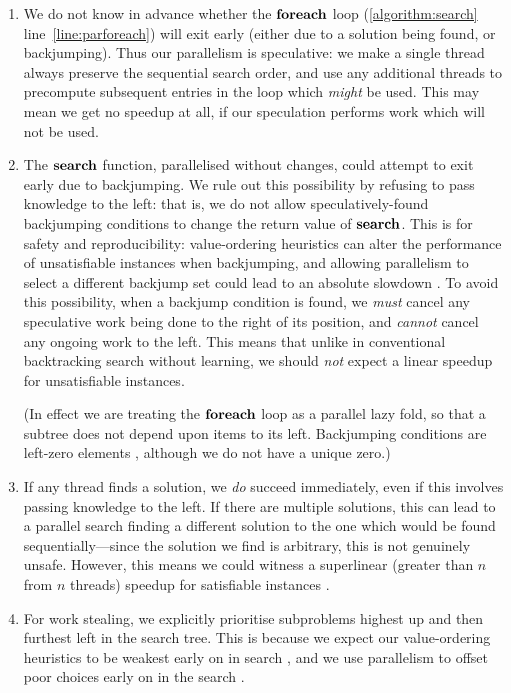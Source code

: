 \documentclass{llncs}
\newcommand{\lineref}[1]{line~\ref{#1}}
\begin{document}
\begin{enumerate}
    \item We do not know in advance whether the $\KwSty{foreach}$ loop (\cref{algorithm:search}
        \lineref{line:parforeach}) will exit early (either due to a solution being found, or
        backjumping). Thus our parallelism is speculative: we make a single thread always preserve
        the sequential search order, and use any additional threads to precompute subsequent entries
        in the loop which \emph{might} be used. This may mean we get no speedup at all, if our
        speculation performs work which will not be used.

    \item The $\KwSty{search}$ function, parallelised without changes, could attempt to exit early
        due to backjumping. We rule out this possibility by refusing to pass knowledge to the left:
        that is, we do not allow speculatively-found backjumping conditions to change the return
        value of $\KwSty{search}$. This is for safety \cite{Trienekens:1990} and reproducibility:
        value-ordering heuristics can alter the performance of unsatisfiable instances when
        backjumping, and allowing parallelism to select a different backjump set could lead to an
        absolute slowdown \cite{Prosser:1993b}. To avoid this possibility, when a backjump condition
        is found, we \emph{must} cancel any speculative work being done to the right of its
        position, and \emph{cannot} cancel any ongoing work to the left.  This means that unlike in
        conventional backtracking search without learning, we should \emph{not} expect a linear
        speedup for unsatisfiable instances.

        (In effect we are treating the $\KwSty{foreach}$ loop as a parallel lazy fold, so that a
        subtree does not depend upon items to its left. Backjumping conditions are left-zero
        elements \cite{Lobachev:2012}, although we do not have a unique zero.)

    \item If any thread finds a solution, we \emph{do} succeed immediately, even if this involves
        passing knowledge to the left. If there are multiple solutions, this can lead to a parallel
        search finding a different solution to the one which would be found sequentially---since the
        solution we find is arbitrary, this is not genuinely unsafe. However, this means we could
        witness a superlinear (greater than $n$ from $n$ threads) speedup for satisfiable instances
        \cite{deBruin:1995}.

    \item For work stealing, we explicitly prioritise subproblems highest up and then furthest left
        in the search tree. This is because we expect our value-ordering heuristics to be weakest
        early on in search \cite{Harvey:1995}, and we use parallelism to offset poor choices early
        on in the search \cite{Chu:2009,McCreesh:2015}.
\end{enumerate}
\end{document}
